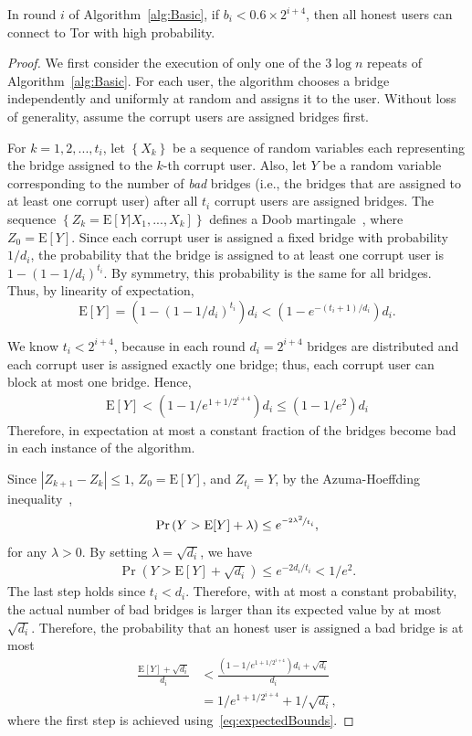 \documentclass[a4paper,UKenglish]{lipics-v2016}
\newcommand{\ie}{i.e.}
\newcommand{\E}{\mathbf{\mathrm{E}}}
\newcommand{\sfsize}{\fontsize{0.68\baselineskip}{0.68\baselineskip}\selectfont}
\newcommand{\sans}[1]{\textbf{\textsf{\sfsize \mbox{#1}}}}
\begin{document}
\begin{lemma}[\sans{Robustness}] \label{lem:robustness}
	In round $i$ of Algorithm~\ref{alg:Basic}, if ${b_i < 0.6 \times 2^{i+4}}$, then all honest users can connect to Tor with high probability.
\end{lemma}
\begin{proof}
	We first consider the execution of only one of the $3\log{n}$ repeats of Algorithm~\ref{alg:Basic}. For each user, the algorithm chooses a bridge independently and uniformly at random and assigns it to the user. Without loss of generality, assume the corrupt users are assigned bridges first.
	
	For ${k=1,2,...,t_i}$, let $\left\{X_k\right\}$ be a sequence of random variables each representing the bridge assigned to the $k$-th corrupt user. Also, let $Y$ be a random variable corresponding to the number of \emph{bad} bridges (\ie, the bridges that are assigned to at least one corrupt user) after all $t_i$ corrupt users are assigned bridges. The sequence ${\left\{Z_k = \E[Y|X_1,...,X_k]\right\}}$ defines a Doob martingale~\cite[Chapter~5]{dubhashi:2009}, where ${Z_0 = \E[Y]}$. 
	Since each corrupt user is assigned a fixed bridge with probability $1/d_i$, the probability that the bridge is assigned to at least one corrupt user is ${1-(1-1/d_i)^{t_i}}$. By symmetry, this probability is the same for all bridges. Thus, by linearity of expectation,
	\[\E[Y] = \left(1 - \left(1-1/d_i\right)^{t_i}\right)d_i < (1 - e^{-(t_i+1)/d_i})d_i.\]
	
	We know ${t_i < 2^{i+4}}$, because in each round ${d_i = 2^{i+4}}$ bridges are distributed and each corrupt user is assigned exactly one bridge; thus, each corrupt user can block at most one bridge. Hence, 
	\begin{align}
	\E[Y] < (1 - 1/e^{1+1/2^{i+4}})d_i \leq (1 - 1/e^2)d_i \label{eq:expectedBounds}
	\end{align}
	Therefore, in expectation at most a constant fraction of the bridges become bad in each instance of the algorithm. 
	
	Since ${|Z_{k+1} - Z_k| \leq 1}$, ${Z_0 = \E[Y]}$, and ${Z_{t_i} = Y}$, by the Azuma-Hoeffding inequality~\cite[Theorem 5.2]{dubhashi:2009},
	\[\Pr\left(Y > \E[Y] + \lambda\right) \leq e^{\nicefrac{-2\lambda^2}{t_i}},\]
	for any ${\lambda > 0}$. 
	By setting ${\lambda = \sqrt{d_i}}$, we have
	\begin{align}
	\Pr(Y > \E[Y] + \sqrt{d_i}) \leq e^{-2d_i/t_i} < 1/e^2. \label{eq:p1}
	\end{align}
	The last step holds since ${t_i < d_i}$. Therefore, with at most a constant probability, the actual number of bad bridges is larger than its expected value by at most $\sqrt{d_i}$. Therefore, the probability that an honest user is assigned a bad bridge is at most
	\begin{align}
	\frac{\E[Y] + \sqrt{d_i}}{d_i} &< \frac{(1-1/e^{1+1/2^{i+4}})d_i + \sqrt{d_i}}{d_i} \nonumber \\ &= 1/e^{1+1/2^{i+4}} + 1/\sqrt{d_i}, \label{eq:p2}
	\end{align}
	where the first step is achieved using~\eqref{eq:expectedBounds}.
	

\end{proof}
\end{document}

